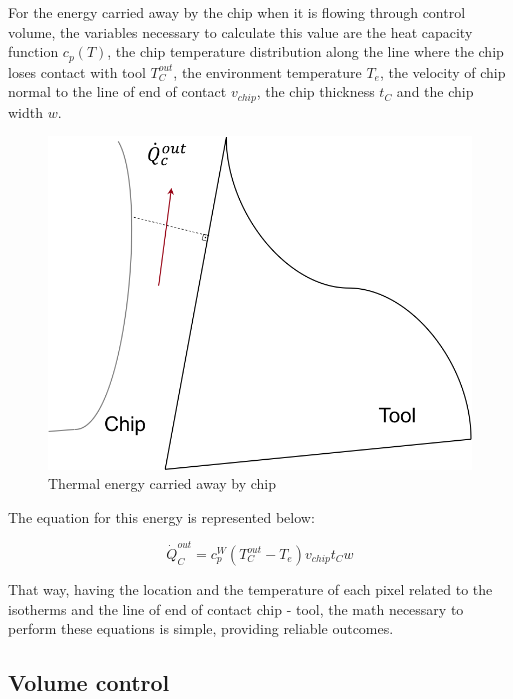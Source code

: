 	For the energy carried away by the chip when it is flowing through control volume, the variables necessary to calculate this value are the heat capacity function $c_{p}(T)$, the chip temperature distribution along the line where the chip loses contact with tool $T_{C}^{out}$, the environment temperature $T_{e}$, the velocity of chip normal to the line of end of contact $v_{chip}$, the chip thickness $t_{C}$ and the chip width $w$.

	\begin{figure}[H]
		\centering
		\captionsetup{justification=centering}
		\includegraphics[scale=0.6]{Cap4/energyChip.png}
		\caption{Thermal energy carried away by chip}
		\label{fig:energychip}
	\end{figure}

	The equation for this energy is represented below:

	\begin{equation} 
	\label{eq_energychip}
		\dot{Q}_{C}^{out} = c_{p}^{W}(T_{C}^{out} - T_{e})v_{chip}t_{C}w
	\end{equation}

	That way, having the location and the temperature of each pixel related to the isotherms and the line of end of contact chip - tool, the math necessary to perform these equations is simple, providing reliable outcomes.

	\subsection{Volume control}


